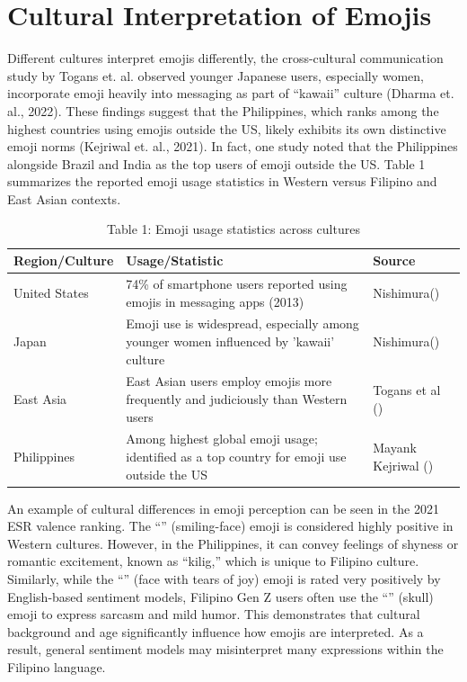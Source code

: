 \section{Cultural Interpretation of Emojis}

Different cultures interpret emojis differently, the cross-cultural communication study by Togans et. al. observed younger Japanese users, especially women, incorporate emoji heavily into messaging as part of “kawaii” culture (Dharma et. al., 2022). These findings suggest that the Philippines, which ranks among the highest countries using emojis outside the US, likely exhibits its own distinctive emoji norms (Kejriwal et. al., 2021). In fact, one study noted that the Philippines alongside Brazil and India as the top users of emoji outside the US. Table 1 summarizes the reported emoji usage statistics in Western versus Filipino and East Asian contexts.

\begin{table}[ht]
	\centering
	\begin{tabular}{m{7em} m{20em} m{5em}}
		Region/Culture & Usage/Statistic & Source \\ [0.5ex]
		\hline
		United States & 74\% of smartphone users reported using emojis in messaging apps (2013) & Nishimura(\citeyear{Nishimura2015}) \\
		\hline
		Japan & Emoji use is widespread, especially among younger women influenced by 'kawaii' culture & Nishimura(\citeyear{Nishimura2015})\\
		\hline
		East Asia & East Asian users employ emojis more frequently and judiciously than Western users & Togans et al (\citeyear{TOGANS2021277}) \\
		\hline
		Philippines & Among highest global emoji usage; identified as a top country for emoji use outside the US & Mayank Kejriwal (\citeyear{Kejriwal2021}) \\
	\end{tabular}
	\caption{Table 1: Emoji usage statistics across cultures}
\end{table}

An example of cultural differences in emoji perception can be seen in the 2021 ESR valence ranking. The “” (smiling-face) emoji is considered highly positive in Western cultures. However, in the Philippines, it can convey feelings of shyness or romantic excitement, known as “kilig,” which is unique to Filipino culture. Similarly, while the “” (face with tears of joy) emoji is rated very positively by English-based sentiment models, Filipino Gen Z users often use the “” (skull) emoji to express sarcasm and mild humor. This demonstrates that cultural background and age significantly influence how emojis are interpreted. As a result, general sentiment models may misinterpret many expressions within the Filipino language.

